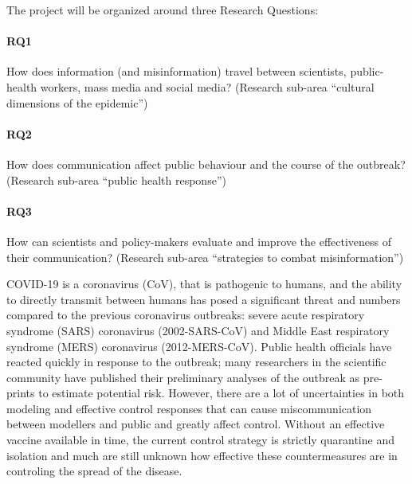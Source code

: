 The project will be organized around three Research Questions:

\paragraph{RQ1} How does information (and misinformation) travel between scientists, public-health workers, mass media and social media? (Research sub-area ``cultural dimensions of the epidemic'')

\paragraph{RQ2} How does communication affect public behaviour and the course of the outbreak? (Research sub-area ``public health response'')

\paragraph{RQ3} How can scientists and policy-makers evaluate and improve the effectiveness of their communication? (Research sub-area ``strategies to combat misinformation'')


COVID-19 is a coronavirus (CoV), that is pathogenic to humans, and the ability to directly transmit between humans has posed a significant threat and numbers compared to the previous coronavirus outbreaks: severe acute respiratory syndrome (SARS) coronavirus (2002-SARS-CoV) and Middle East respiratory syndrome (MERS) coronavirus (2012-MERS-CoV). 
Public health officials have reacted quickly in response to the outbreak; many researchers in the scientific community have published their preliminary analyses of the outbreak as pre-prints to estimate potential risk. 
However, there are a lot of uncertainties in both modeling and effective control responses that can cause miscommunication between modellers and public and greatly affect control.   
Without an effective vaccine available in time, the current control strategy is strictly quarantine and isolation and much are still unknown how effective these countermeasures are in controling the spread of the disease.  



